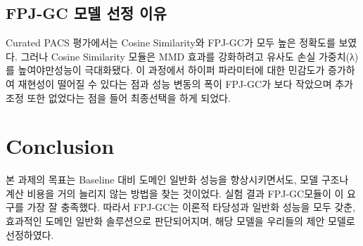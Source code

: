 \subsection{FPJ-GC 모델 선정 이유}
Curated PACS 평가에서는 Cosine Similarity와 FPJ-GC가 모두 높은 정확도를 보였다. 
그러나 Cosine Similarity 모듈은 MMD 효과를 강화하려고 유사도 손실 가중치(λ)를 높여야만성능이 극대화됐다. 
이 과정에서 하이퍼 파라미터에 대한 민감도가 증가하여 재현성이 떨어질 수 있다는 점과 성능 변동의 폭이 
FPJ-GC가 보다 작았으며 추가조정 또한 없었다는 점을 들어 최종선택을 하게 되었다.

\section{Conclusion}
본 과제의 목표는 Baseline 대비 도메인 일반화 성능을 향상시키면서도, 모델 구조나 계산 비용을 거의 늘리지 
않는 방법을 찾는 것이었다. 실험 결과 FPJ-GC모듈이 이 요구를 가장 잘 충족했다. 따라서 FPJ-GC는 이론적 타당성과 일반화 
성능을 모두 갖춘, 효과적인 도메인 일반화 솔루션으로 판단되어지며, 해당 모델을 우리들의 제안 모델로 선정하였다.


